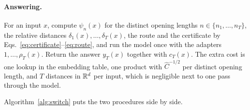 \paragraph{Answering.} For an input $x$, compute $\psi_{n}(x)$ for the distinct opening lengths
$n \in \{n_1, \dots, n_T\}$, the relative distances $\delta_1(x), \dots, \delta_T(x)$, the route and
the certificate by Eqs.~\eqref{eq:certificate}--\eqref{eq:route}, and run the model once with the
adapters $1, \dots, \rho_T(x)$. Return the answer $y_T(x)$ together with $c_T(x)$. The extra cost is
one lookup in the embedding table, one product with $\hat C^{-1/2}$ per distinct opening length, and $T$ distances in $\mathbb{R}^d$ per input, which is negligible next to
one pass through the model.

Algorithm~\ref{alg:switch} puts the two procedures side by side.

